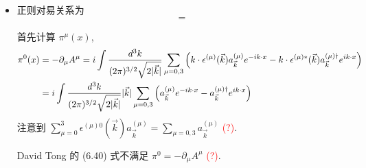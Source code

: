 \begin{itemize}
\begin{itemize}
		\item 正则对易关系为
		\begin{equation}
			[\pi_\mu(t, \vec{x}), A_\nu(t, \vec{y})] = 
		\end{equation}
		
		\begin{tcolorbox}[title=calculation:]
			首先计算 $\pi^\mu(x)$,
			\begin{align}
				\pi^0(x) &= - \partial_\mu A^\mu = i \int \frac{d^3 k}{(2 \pi)^{3 / 2} \sqrt{2 |\vec{k}|}} \sum_{\mu = 0, 3} \Big( k \cdot \epsilon^{(\mu)}(\vec{k}) a^{(\mu)}_{\vec{k}} e^{- i k \cdot x} - k \cdot \epsilon^{(\mu) *}(\vec{k}) a^{(\mu) \dag}_{\vec{k}} e^{i k \cdot x} \Big) \notag \\
				&= i \int \frac{d^3 k}{(2 \pi)^{3 / 2} \sqrt{2 |\vec{k}|}} |\vec{k}| \sum_{\mu = 0, 3} \Big( a^{(\mu)}_{\vec{k}} e^{- i k \cdot x} - a^{(\mu) \dag}_{\vec{k}} e^{i k \cdot x} \Big)
			\end{align}
			注意到 $\sum_{\mu = 0}^3 \epsilon^{(\mu) 0}(\vec{k}) a^{(\mu)}_{\vec{k}} = \sum_{\mu = 0, 3} a^{(\mu)}_{\vec{k}}$ \textcolor{red}{(?)}.
			
			David Tong 的 (6.40) 式不满足 $\pi^0 = - \partial_\mu A^\mu$ \textcolor{red}{(?)}.
		\end{tcolorbox}
	\end{itemize}
\end{itemize}
